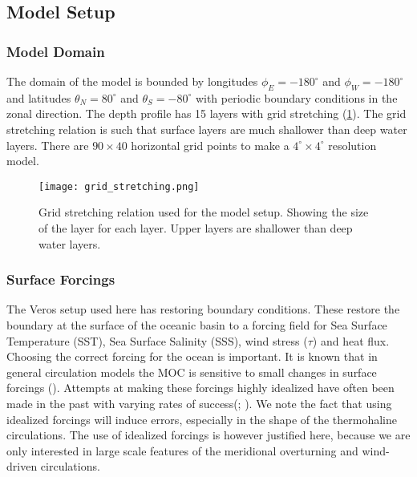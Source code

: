 
\subsection{Model Setup}
\subsubsection{Model Domain}
The domain of the model is bounded by longitudes $\phi_E=-180^{\circ}$ and $\phi_W=-180^{\circ}$ and latitudes $\theta_N=80^{\circ}$ and $\theta_S=-80^{\circ}$ with periodic boundary conditions in the zonal direction.
 The depth profile has 15 layers with grid stretching (\cref{fig:gridstrech}). The grid stretching relation is such that surface layers are much shallower than deep water layers. There are $90 \times 40$ horizontal grid points to make a $4^{\circ} \times 4^{\circ}$ resolution model.
 
 \begin{figure}[H]
 	\texttt{[image: grid\_stretching.png]}
 	\caption{Grid stretching relation used for the model setup. Showing the size of the layer for each layer. Upper layers are shallower than deep water layers.}
 	\label{fig:gridstrech}
 \end{figure}

\subsubsection{Surface Forcings}\label{sec:forcing_ideal}
The Veros setup used here has restoring boundary conditions. These restore the boundary at the surface of the oceanic basin to a forcing field for Sea Surface Temperature (SST), Sea Surface Salinity (SSS), wind stress ($\tau$) and heat flux.
Choosing the correct forcing for the ocean is important. It is known that in general circulation models the MOC is sensitive to small changes in surface forcings (\cite{Milliff1999May}). Attempts at making these forcings highly idealized have often been made in the past with varying rates of success(\cite{bryan1987parameter}; \cite{Mulder2017Jul}). We note the fact that using idealized forcings will induce errors, especially in the shape of the thermohaline circulations. The use of idealized forcings is however justified here, because we are only interested in large scale features of the meridional overturning and wind-driven circulations.

